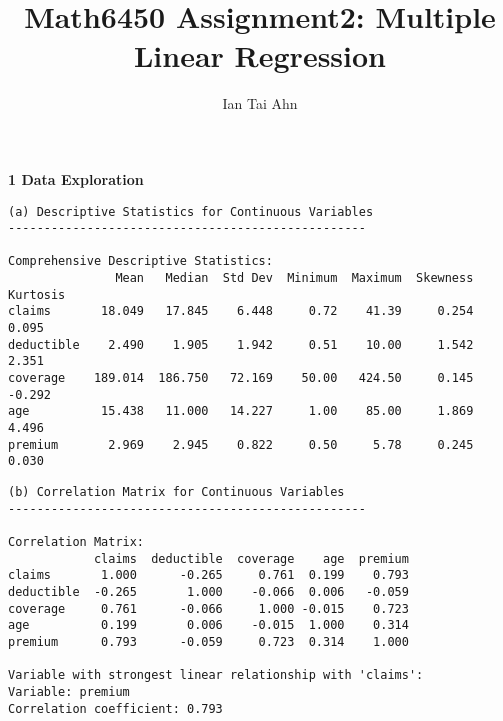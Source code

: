 \documentclass[8pt, twocolumn]{extarticle}
\title{Math6450 Assignment2: Multiple Linear Regression}
\author{Ian Tai Ahn}
\begin{document}
    \maketitle
    \textbf{1 Data Exploration}
    \begin{Verbatim}[commandchars=\\\{\}]
(a) Descriptive Statistics for Continuous Variables
--------------------------------------------------

Comprehensive Descriptive Statistics:
               Mean   Median  Std Dev  Minimum  Maximum  Skewness  Kurtosis
claims       18.049   17.845    6.448     0.72    41.39     0.254     0.095
deductible    2.490    1.905    1.942     0.51    10.00     1.542     2.351
coverage    189.014  186.750   72.169    50.00   424.50     0.145    -0.292
age          15.438   11.000   14.227     1.00    85.00     1.869     4.496
premium       2.969    2.945    0.822     0.50     5.78     0.245     0.030
    \end{Verbatim}
    \begin{Verbatim}[commandchars=\\\{\}]
(b) Correlation Matrix for Continuous Variables
--------------------------------------------------

Correlation Matrix:
            claims  deductible  coverage    age  premium
claims       1.000      -0.265     0.761  0.199    0.793
deductible  -0.265       1.000    -0.066  0.006   -0.059
coverage     0.761      -0.066     1.000 -0.015    0.723
age          0.199       0.006    -0.015  1.000    0.314
premium      0.793      -0.059     0.723  0.314    1.000

Variable with strongest linear relationship with 'claims':
Variable: premium
Correlation coefficient: 0.793
    \end{Verbatim}
    \begin{center}
    \end{center}
    { \hspace*{\fill} \\}
\end{document}
